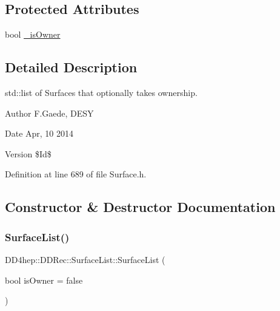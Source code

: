 \subsection*{Protected Attributes}
\begin{DoxyCompactItemize}
\item 
bool \hyperlink{class_d_d4hep_1_1_d_d_rec_1_1_surface_list_a6eb49bbfb8b3b4f548dd9d52f0e0e507}{\+\_\+is\+Owner}
\end{DoxyCompactItemize}


\subsection{Detailed Description}
std\+::list of Surfaces that optionally takes ownership. \begin{DoxyAuthor}{Author}
F.\+Gaede, D\+E\+SY 
\end{DoxyAuthor}
\begin{DoxyDate}{Date}
Apr, 10 2014 
\end{DoxyDate}
\begin{DoxyVersion}{Version}
\$\+Id\$ 
\end{DoxyVersion}


Definition at line 689 of file Surface.\+h.



\subsection{Constructor \& Destructor Documentation}
\hypertarget{class_d_d4hep_1_1_d_d_rec_1_1_surface_list_abc669093649a9e2714176cd2162f75b5}{}\label{class_d_d4hep_1_1_d_d_rec_1_1_surface_list_abc669093649a9e2714176cd2162f75b5} 
\subsubsection{\texorpdfstring{Surface\+List()}{SurfaceList()}\hspace{0.1cm}{\footnotesize\ttfamily [1/4]}}
{\footnotesize\ttfamily D\+D4hep\+::\+D\+D\+Rec\+::\+Surface\+List\+::\+Surface\+List (\begin{DoxyParamCaption}\item[{bool}]{is\+Owner = {\ttfamily false} }\end{DoxyParamCaption})\hspace{0.3cm}{\ttfamily [inline]}}



